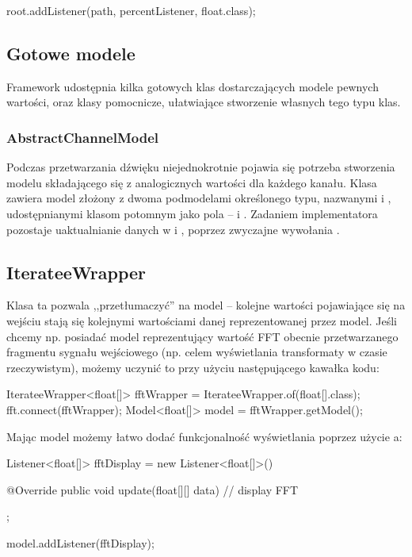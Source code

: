 \begin{java}
root.addListener(path, percentListener, float.class);
\end{java}


\subsection{Gotowe modele}

Framework udostępnia kilka gotowych klas dostarczających modele pewnych wartości, oraz klasy
pomocnicze, ułatwiające stworzenie własnych tego typu klas.

\subsubsection{AbstractChannelModel}

Podczas przetwarzania dźwięku niejednokrotnie pojawia się potrzeba stworzenia modelu składającego
się z analogicznych wartości dla każdego kanału. Klasa  zawiera model
złożony z dwoma podmodelami określonego typu, nazwanymi  i , udostępnianymi
klasom potomnym jako pola  --  i . Zadaniem
implementatora pozostaje uaktualnianie danych w  i , poprzez
zwyczajne wywołania .

\subsection{IterateeWrapper}

Klasa ta pozwala ,,przetłumaczyć''  na model -- kolejne wartości pojawiające się na
wejściu  stają się kolejnymi wartościami danej reprezentowanej przez model. Jeśli
chcemy np. posiadać model reprezentujący wartość FFT obecnie przetwarzanego fragmentu sygnału
wejściowego (np. celem wyświetlania transformaty w czasie rzeczywistym), możemy uczynić to przy
użyciu następującego kawałka kodu:

\begin{java}
IterateeWrapper<float[]> fftWrapper = IterateeWrapper.of(float[].class);
fft.connect(fftWrapper);
Model<float[]> model = fftWrapper.getModel();
\end{java}

Mając model możemy łatwo dodać funkcjonalność wyświetlania poprzez użycie a:

\begin{java}
Listener<float[]> fftDisplay = new Listener<float[]>() {

    @Override
    public void update(float[][] data) {
        // display FFT
    }
};

model.addListener(fftDisplay);
\end{java}

